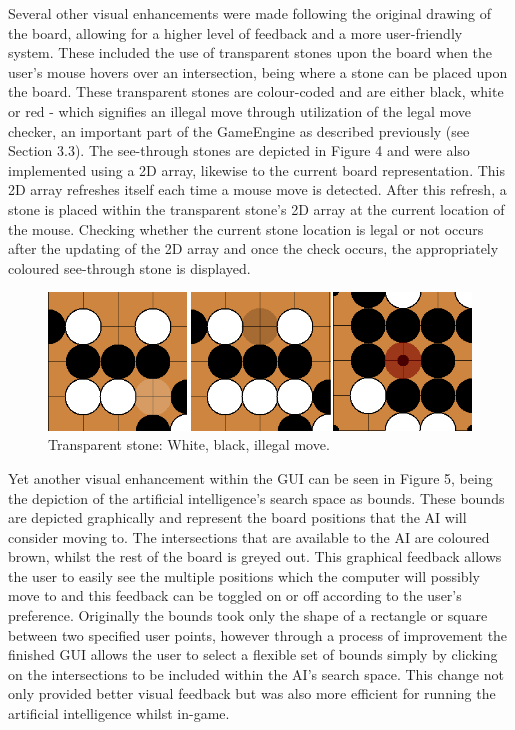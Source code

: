 \documentclass{l3proj}
\begin{document}
Several other visual enhancements were made following the original drawing of the board, allowing for a higher level of feedback and a more user-friendly system. These included the use of transparent stones upon the board when the user's mouse hovers over an intersection, being where a stone can be placed upon the board. These transparent stones are colour-coded and are either black, white or red - which signifies an illegal move through utilization of the legal move checker, an important part of the GameEngine as described previously (see Section 3.3). The see-through stones are depicted in Figure 4 and were also implemented using a 2D array, likewise to the current board representation. This 2D array refreshes itself each time a mouse move is detected. After this refresh, a stone is placed within the transparent stone's 2D array at the current location of the mouse. Checking whether the current stone location is legal or not occurs after the updating of the 2D array and once the check occurs, the appropriately coloured see-through stone is displayed.

\begin{figure}[H]
\centering
\includegraphics[scale=0.7]{Images/GUI-4-Transparent.png}
\caption{Transparent stone: White, black, illegal move.}
\end{figure}

Yet another visual enhancement within the GUI can be seen in Figure 5, being the depiction of the artificial intelligence's search space as bounds. These bounds are depicted graphically and represent the board positions that the AI will consider moving to. The intersections that are available to the AI are coloured brown, whilst the rest of the board is greyed out. This graphical feedback allows the user to easily see the multiple positions which the computer will possibly move to and this feedback can be toggled on or off according to the user's preference. Originally the bounds took only the shape of a rectangle or square between two specified user points, however through a process of improvement the finished GUI allows the user to select a flexible set of bounds simply by clicking on the intersections to be included within the AI's search space. This change not only provided better visual feedback but was also more efficient for running the artificial intelligence whilst in-game.
\end{document}
